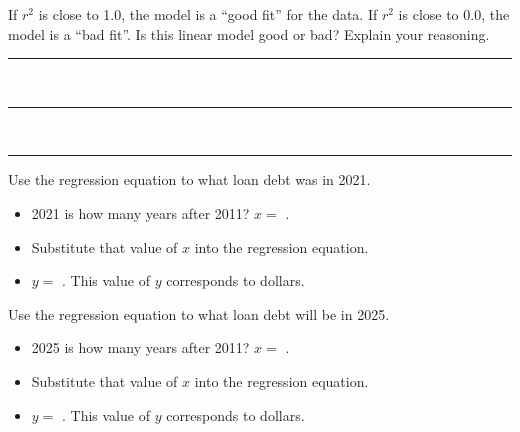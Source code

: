 \noindent
If $r^2$ is close to 1.0, the model is a ``good fit'' for the data.
If $r^2$ is close to 0.0, the model is a ``bad fit''.
Is this linear model good or bad? 
Explain your reasoning.\\[0.65\onelineskip]

\noindent\rule[\onelineskip]{\textwidth}{0.4pt}\\[0.65\onelineskip]
\noindent\rule[\onelineskip]{\textwidth}{0.4pt}\\[0.65\onelineskip]
\noindent\rule[\onelineskip]{\textwidth}{0.4pt}

\begin{minipage}{0.45\textwidth}
    \noindent 
    Use the regression equation to  
    what loan debt was in 2021.
    \begin{itemize}[fullwidth]
        \item 2021 is how many years after 2011? $x =$ .
        \item Substitute that value of $x$ into the regression equation.
        \item $y =$ . 
        This value of $y$ corresponds to  dollars.
    \end{itemize}
\end{minipage}
\hfill
\begin{minipage}{0.45\textwidth}
    \noindent 
    Use the regression equation to  
    what loan debt will be in 2025.
    \begin{itemize}[fullwidth]
        \item 2025 is how many years after 2011? $x =$ .
        \item Substitute that value of $x$ into the regression equation.
        \item $y =$ . 
        This value of $y$ corresponds to  dollars.
    \end{itemize}
\end{minipage}